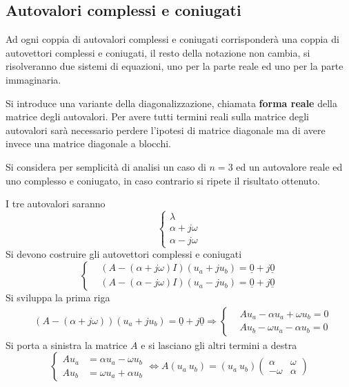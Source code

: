 \subsection{Autovalori complessi e coniugati}
Ad ogni coppia di autovalori complessi e coniugati corrisponderà una coppia di
autovettori complessi e coniugati, il resto della notazione non cambia, si
risolveranno due sistemi di equazioni, uno per la parte reale ed uno per la
parte immaginaria.

Si introduce una variante della diagonalizzazione, chiamata \textbf{forma
reale} della matrice degli autovalori.
Per avere tutti termini reali sulla matrice degli autovalori sarà necessario
perdere l'ipotesi di matrice diagonale ma di avere invece una matrice diagonale
a blocchi.

Si considera per semplicità di analisi un caso di $n=3$ ed un autovalore reale
ed uno complesso e coniugato, in caso contrario si ripete il risultato ottenuto.

I tre autovalori saranno
$$\left\{\begin{matrix}
\lambda \\ \alpha+j\omega \\ \alpha-j\omega
\end{matrix}\right.$$
Si devono costruire gli autovettori complessi e coniugati
$$\left\{\begin{aligned}
&(A-(\alpha+j\omega)I)(u_a+ju_b) = \underline{0} + j\underline{0}\\
&(A-(\alpha-j\omega)I)(u_a-ju_b) = \underline{0} + j\underline{0}
\end{aligned}\right.$$
Si sviluppa la prima riga
$$\begin{aligned}
&(A-(\alpha+j\omega))(u_a + ju_b) = \underline{0} +
j\underline{0}\Rightarrow
\left\{\begin{aligned}
&Au_a - \alpha u_a + \omega u_b = 0\\
&Au_b - \omega u_a -\alpha u_b = 0
\end{aligned}\right.
\end{aligned}$$
Si porta a sinistra la matrice $A$ e si lasciano gli altri termini a destra
$$
\left\{\begin{aligned}
Au_a &= \alpha u_a - \omega u_b \\
Au_b &= \omega u_a + \alpha u_b
\end{aligned}\right. \Leftrightarrow A (u_a \ u_b) = (u_a \ u_b)
\begin{pmatrix}
\alpha & \omega\\
-\omega & \alpha
\end{pmatrix}
$$

